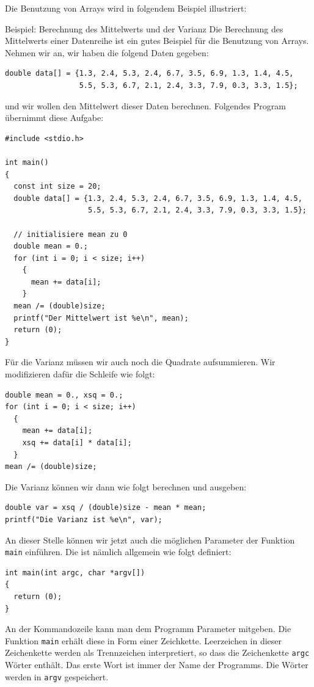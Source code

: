 Die Benutzung von Arrays wird in folgendem Beispiel illustriert:
\begin{myexampleprogram}{Beispiel: Berechnung des Mittelwerts und der Varianz}
  Die Berechnung des Mittelwerts einer Datenreihe ist ein gutes Beispiel für die Benutzung von Arrays.
  Nehmen wir an, wir haben die folgend Daten gegeben:
\begin{lstlisting}
double data[] = {1.3, 2.4, 5.3, 2.4, 6.7, 3.5, 6.9, 1.3, 1.4, 4.5,
                 5.5, 5.3, 6.7, 2.1, 2.4, 3.3, 7.9, 0.3, 3.3, 1.5};
\end{lstlisting}
  und wir wollen den Mittelwert dieser Daten berechnen.
  Folgendes Program übernimmt diese Aufgabe:
\begin{lstlisting}
#include <stdio.h>

int main()
{
  const int size = 20;
  double data[] = {1.3, 2.4, 5.3, 2.4, 6.7, 3.5, 6.9, 1.3, 1.4, 4.5,
                   5.5, 5.3, 6.7, 2.1, 2.4, 3.3, 7.9, 0.3, 3.3, 1.5};

  // initialisiere mean zu 0
  double mean = 0.;
  for (int i = 0; i < size; i++)
    {
      mean += data[i];
    }
  mean /= (double)size;
  printf("Der Mittelwert ist %e\n", mean);
  return (0);
}
\end{lstlisting}
  Für die Varianz müssen wir auch noch die Quadrate aufsummieren.
  Wir modifizieren dafür die Schleife wie folgt:
\begin{lstlisting}
double mean = 0., xsq = 0.;
for (int i = 0; i < size; i++)
  {
    mean += data[i];
    xsq += data[i] * data[i];
  }
mean /= (double)size;
\end{lstlisting}
  Die Varianz können wir dann wie folgt berechnen und ausgeben:
\begin{lstlisting}
double var = xsq / (double)size - mean * mean;
printf("Die Varianz ist %e\n", var);
\end{lstlisting}
\end{myexampleprogram}
An dieser Stelle können wir jetzt auch die möglichen Parameter der Funktion \verb|main| einführen.
Die ist nämlich allgemein wie folgt definiert:
\begin{lstlisting}
int main(int argc, char *argv[])
{
  return (0);
}
\end{lstlisting}
An der Kommandozeile kann man dem Programm Parameter mitgeben.
Die Funktion \verb|main| erhält diese in Form einer Zeichkette.
Leerzeichen in dieser Zeichenkette werden als Trennzeichen interpretiert, so dass die Zeichenkette \verb|argc| Wörter enthält.
Das erste Wort ist immer der Name der Programms.
Die Wörter werden in \verb|argv| gespeichert.
